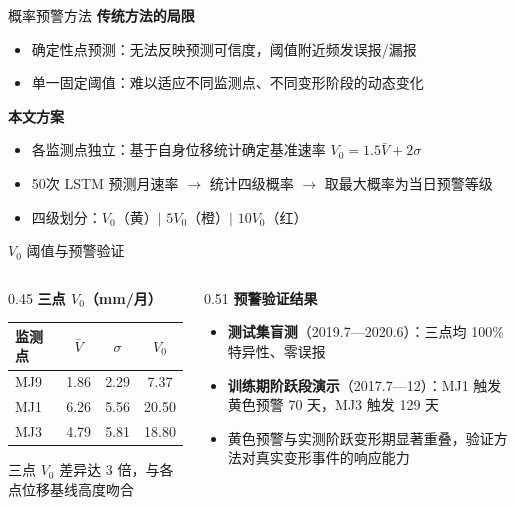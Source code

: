 \documentclass[aspectratio=169,12pt]{beamer}
\begin{document}
\begin{frame}{概率预警方法}
  \textbf{传统方法的局限}
  \begin{itemize}
    \item 确定性点预测：无法反映预测可信度，阈值附近频发误报/漏报
    \item 单一固定阈值：难以适应不同监测点、不同变形阶段的动态变化
  \end{itemize}
  \vspace{0.5em}
  \textbf{本文方案}
  \begin{itemize}
    \item 各监测点独立：基于自身位移统计确定基准速率 $V_0 = 1.5\bar V + 2\sigma$
    \item 50次 LSTM 预测月速率 $\to$ 统计四级概率 $\to$ 取最大概率为当日预警等级
    \item 四级划分：$V_0$（黄）$\mid$ $5V_0$（橙）$\mid$ $10V_0$（红）
  \end{itemize}
\end{frame}

\begin{frame}{$V_0$ 阈值与预警验证}
  \begin{columns}[T]
    \begin{column}{0.45\textwidth}
      \textbf{三点 $V_0$（mm/月）}
      \begin{table}
        \centering
        \begin{tabular}{lccc}
          \toprule
          监测点 & $\bar V$ & $\sigma$ & $V_0$ \\
          \midrule
          MJ9 & 1.86 & 2.29 & 7.37  \\
          MJ1 & 6.26 & 5.56 & 20.50 \\
          MJ3 & 4.79 & 5.81 & 18.80 \\
          \bottomrule
        \end{tabular}
      \end{table}
      \vspace{0.3em}
      {\small 三点 $V_0$ 差异达 3 倍，与各点位移基线高度吻合}
    \end{column}
    \begin{column}{0.51\textwidth}
      \textbf{预警验证结果}
      \begin{itemize}
        \item \textbf{测试集盲测}（2019.7—2020.6）：三点均 \alert{100\% 特异性、零误报}
        \item \textbf{训练期阶跃段演示}（2017.7—12）：MJ1 触发 \alert{黄色预警 70 天}，MJ3 触发 \alert{129 天}
        \item 黄色预警与实测阶跃变形期显著重叠，验证方法对真实变形事件的响应能力
      \end{itemize}
    \end{column}
  \end{columns}
\end{frame}
\end{document}
